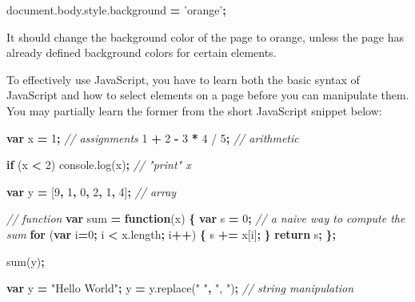 \documentclass[12pt,]{krantz}
\makeatletter
\newenvironment{Shaded}{\begin{snugshade}}{\end{snugshade}}
\newcommand{\KeywordTok}[1]{\textcolor[rgb]{0.13,0.29,0.53}{\textbf{#1}}}
\newcommand{\DecValTok}[1]{\textcolor[rgb]{0.00,0.00,0.81}{#1}}
\newcommand{\StringTok}[1]{\textcolor[rgb]{0.31,0.60,0.02}{#1}}
\newcommand{\CommentTok}[1]{\textcolor[rgb]{0.56,0.35,0.01}{\textit{#1}}}
\newcommand{\VariableTok}[1]{\textcolor[rgb]{0.00,0.00,0.00}{#1}}
\newcommand{\ControlFlowTok}[1]{\textcolor[rgb]{0.13,0.29,0.53}{\textbf{#1}}}
\newcommand{\OperatorTok}[1]{\textcolor[rgb]{0.81,0.36,0.00}{\textbf{#1}}}
\newcommand{\AttributeTok}[1]{\textcolor[rgb]{0.77,0.63,0.00}{#1}}
\newcommand{\NormalTok}[1]{#1}
\newenvironment{kframe}{%
\medskip{}
\setlength{\fboxsep}{.8em}
 \def\at@end@of@kframe{}%
 \ifinner\ifhmode%
  \def\at@end@of@kframe{\end{minipage}}%
  \begin{minipage}{\columnwidth}%
 \fi\fi%
 \def\FrameCommand##1{\hskip\@totalleftmargin \hskip-\fboxsep
 \colorbox{shadecolor}{##1}\hskip-\fboxsep
     \hskip-\linewidth \hskip-\@totalleftmargin \hskip\columnwidth}%
 \MakeFramed {\advance\hsize-\width
   \@totalleftmargin\z@ \linewidth\hsize
   \@setminipage}}%
 {\par\unskip\endMakeFramed%
 \at@end@of@kframe}
\renewenvironment{Shaded}{\begin{kframe}}{\end{kframe}}
\theoremstyle{definition}
\theoremstyle{definition}
\theoremstyle{definition}
\theoremstyle{remark}
\makeatother
\begin{document}
\begin{Shaded}
\begin{Highlighting}[]
\VariableTok{document}\NormalTok{.}\VariableTok{body}\NormalTok{.}\VariableTok{style}\NormalTok{.}\AttributeTok{background} \OperatorTok{=} \StringTok{'orange'}\OperatorTok{;}
\end{Highlighting}
\end{Shaded}

It should change the background color of the page to orange, unless the
page has already defined background colors for certain elements.

To effectively use JavaScript, you have to learn both the basic syntax
of JavaScript and how to select elements on a page before you can
manipulate them. You may partially learn the former from the short
JavaScript snippet below:

\begin{Shaded}
\begin{Highlighting}[]
\KeywordTok{var}\NormalTok{ x }\OperatorTok{=} \DecValTok{1}\OperatorTok{;}  \CommentTok{// assignments}
\DecValTok{1} \OperatorTok{+} \DecValTok{2} \OperatorTok{-} \DecValTok{3} \OperatorTok{*} \DecValTok{4}\NormalTok{ / }\DecValTok{5}\OperatorTok{;}  \CommentTok{// arithmetic}

\ControlFlowTok{if}\NormalTok{ (x }\OperatorTok{<} \DecValTok{2}\NormalTok{) }\VariableTok{console}\NormalTok{.}\AttributeTok{log}\NormalTok{(x)}\OperatorTok{;}  \CommentTok{// "print" x}

\KeywordTok{var}\NormalTok{ y }\OperatorTok{=}\NormalTok{ [}\DecValTok{9}\OperatorTok{,} \DecValTok{1}\OperatorTok{,} \DecValTok{0}\OperatorTok{,} \DecValTok{2}\OperatorTok{,} \DecValTok{1}\OperatorTok{,} \DecValTok{4}\NormalTok{]}\OperatorTok{;}  \CommentTok{// array}

\CommentTok{// function}
\KeywordTok{var}\NormalTok{ sum }\OperatorTok{=} \KeywordTok{function}\NormalTok{(x) }\OperatorTok{\{}
  \KeywordTok{var}\NormalTok{ s }\OperatorTok{=} \DecValTok{0}\OperatorTok{;}
  \CommentTok{// a naive way to compute the sum}
  \ControlFlowTok{for}\NormalTok{ (}\KeywordTok{var}\NormalTok{ i}\OperatorTok{=}\DecValTok{0}\OperatorTok{;}\NormalTok{ i }\OperatorTok{<} \VariableTok{x}\NormalTok{.}\AttributeTok{length}\OperatorTok{;}\NormalTok{ i}\OperatorTok{++}\NormalTok{) }\OperatorTok{\{}
\NormalTok{    s }\OperatorTok{+=}\NormalTok{ x[i]}\OperatorTok{;}
  \OperatorTok{\}}
  \ControlFlowTok{return}\NormalTok{ s}\OperatorTok{;}
\OperatorTok{\};}

\AttributeTok{sum}\NormalTok{(y)}\OperatorTok{;}

\KeywordTok{var}\NormalTok{ y }\OperatorTok{=} \StringTok{"Hello World"}\OperatorTok{;}
\NormalTok{y }\OperatorTok{=} \VariableTok{y}\NormalTok{.}\AttributeTok{replace}\NormalTok{(}\StringTok{" "}\OperatorTok{,} \StringTok{", "}\NormalTok{)}\OperatorTok{;}  \CommentTok{// string manipulation}
\end{Highlighting}
\end{Shaded}
\end{document}
